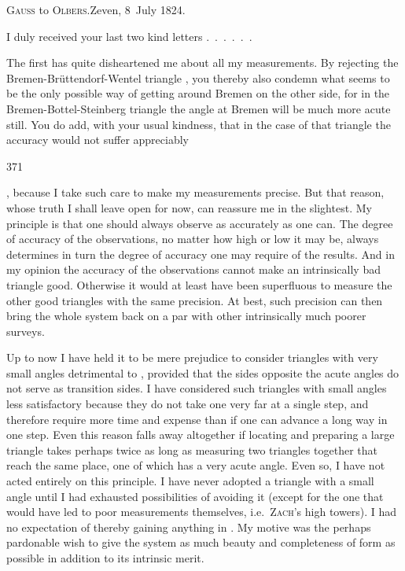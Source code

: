 \begin{center}
\textsc{Gauss} to \textsc{Olbers}.\quad Zeven, 8~July 1824.
\end{center}

\par\noindent\hspace*{\parindent}I duly received your last two kind letters .\ .\ .\ .\ .\ .

\par\noindent\hspace*{\parindent}The first has quite disheartened me about all my measurements.
By rejecting the Bremen-Brüttendorf-Wentel triangle , you thereby also condemn what seems to be
the only possible way of getting around Bremen on the other side, for in the
Bremen-Bottel-Steinberg triangle the angle at Bremen will be much more
acute still. You do add, with your usual kindness, that in the case of that
triangle the accuracy would not suffer appreciably
\par\clearpage
{}\hfill371\par\medskip
\noindent{}, because I take such care to make my measurements precise.
But that reason, whose truth I shall leave open for now, can  reassure me
in the slightest.
My principle is that one should always observe as accurately as one can.
The degree of accuracy of the observations, no matter how high or low it
may be, always determines in turn the degree of accuracy one may require
of the results. And in my opinion the accuracy of the observations cannot
make an intrinsically bad triangle good. Otherwise it would at least have
been superfluous to measure the other good triangles with the same precision.
At best, such precision can then bring the whole system back on a par with
other intrinsically much poorer surveys.

\par\noindent\hspace*{\parindent}Up to now I have held it to be mere prejudice to consider triangles
with very small angles detrimental to , provided that the sides
opposite the acute angles do not serve as transition sides. I have considered
such triangles with small angles less satisfactory  because they
do not take one very far at a single step, and therefore require more time and
expense than if one can advance a long way in one step. Even this reason
falls away altogether if locating and preparing a large triangle takes perhaps
twice as long as measuring two triangles together that reach the same place,
one of which has a very acute angle. Even so, I have not acted entirely on
this principle. I have never adopted a triangle with a small angle until I had
exhausted  possibilities of avoiding it (except for the one that would
have led to poor measurements themselves, i.e.\ \textsc{Zach}'s high towers).
I had no expectation of thereby gaining anything in .
My motive was the perhaps pardonable wish to give the system as much beauty
and completeness of form as possible in addition to its intrinsic merit.

